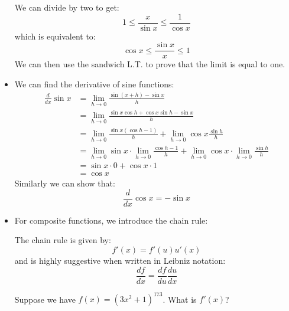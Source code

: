 \begin{itemize}
\begin{example}
\begin{equation}
        \end{equation}
        We can divide by two to get:
        \begin{equation}
            1 \le \frac{x}{\sin x} \le \frac{1}{\cos x}
            \label{eq:}
        \end{equation}
        which is equivalent to:
        \begin{equation}
            \cos x \le \frac{\sin x}{x} \le 1
            \label{eq:}
        \end{equation}
        We can then use the sandwich L.T. to prove that the limit is equal to one.
    \end{example}
    \item We can find the derivative of sine functions:
    \begin{align}
        \frac{d}{dx}\sin x &= \lim_{h\to 0} \frac{\sin(x+h)-\sin x}{h} \\ 
        &= \lim_{h\to 0} \frac{\sin x\cos h+\cos x\sin h - \sin x}{h} \\ 
        &= \lim_{h\to 0} \frac{\sin x(\cos h-1)}{h}+\lim_{h\to0} \cos x\frac{\sin h}{h} \\ 
        &= \lim_{h\to 0}\sin x \cdot \lim_{h\to 0} \frac{\cos h-1}{h} + \lim_{h\to 0} \cos x \cdot \lim_{h\to 0} \frac{\sin h}{h} \\ 
        &= \sin x \cdot 0 + \cos x \cdot 1 \\ 
        &= \cos x
        \label{eq:}
    \end{align}
    Similarly we can show that:
    \begin{equation}
        \frac{d}{dx}\cos x = -\sin x
        \label{eq:}
    \end{equation}
    \item For composite functions, we introduce the chain rule:
    \begin{theorem}
        The chain rule is given by:
        \begin{equation}
            f'(x)=f'(u)u'(x)
            \label{eq:}
        \end{equation}
        and is highly suggestive when written in Leibniz notation:
        \begin{equation}
            \frac{df}{dx} = \frac{df}{du}\frac{du}{dx}
            \label{eq:}
        \end{equation}
        
    \end{theorem}
    
    \begin{example}
        Suppose we have $f(x)=(3x^2+1)^{173}$. What is $f'(x)$?
        \vspace{2mm}


\end{example}
\end{itemize}

